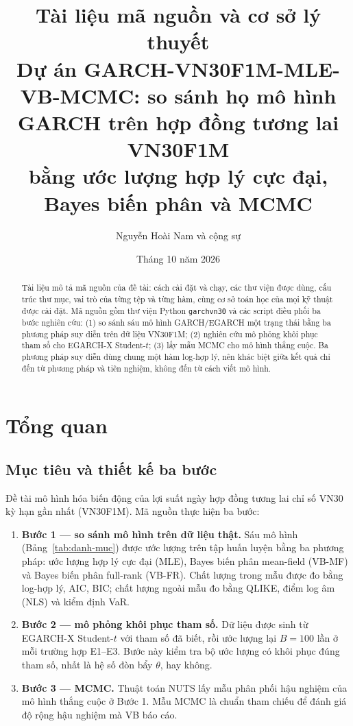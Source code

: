 \documentclass[11pt,a4paper]{article}
\title{\textbf{Tài liệu mã nguồn và cơ sở lý thuyết}\\[0.3em]
\large Dự án GARCH-VN30F1M-MLE-VB-MCMC: so sánh họ mô hình GARCH trên hợp đồng tương lai VN30F1M\\
bằng ước lượng hợp lý cực đại, Bayes biến phân và MCMC}
\author{Nguyễn Hoài Nam và cộng sự}
\date{Tháng 10 năm 2026}
\renewcommand{\_}{\gachduoi\allowbreak}
\newcommand{\tep}[1]{\texttt{#1}}
\begin{document}
\maketitle
\begin{abstract}
\noindent
Tài liệu mô tả mã nguồn của đề tài: cách cài đặt và chạy, các thư viện được dùng, cấu trúc thư mục, vai trò của từng tệp và từng hàm, cùng cơ sở toán học của mọi kỹ thuật được cài đặt. Mã nguồn gồm thư viện Python \tep{garch\_vn30} và các script điều phối ba bước nghiên cứu: (1) so sánh sáu mô hình GARCH/EGARCH một trạng thái bằng ba phương pháp suy diễn trên dữ liệu VN30F1M; (2) nghiên cứu mô phỏng khôi phục tham số cho EGARCH-X Student-$t$; (3) lấy mẫu MCMC cho mô hình thắng cuộc. Ba phương pháp suy diễn dùng chung một hàm log-hợp lý, nên khác biệt giữa kết quả chỉ đến từ phương pháp và tiên nghiệm, không đến từ cách viết mô hình.
\end{abstract}
\tableofcontents
\clearpage

\section{Tổng quan}
\subsection{Mục tiêu và thiết kế ba bước}
Đề tài mô hình hóa biến động của lợi suất ngày hợp đồng tương lai chỉ số VN30 kỳ hạn gần nhất (VN30F1M). Mã nguồn thực hiện ba bước:

\begin{enumerate}
\item \textbf{Bước 1 — so sánh mô hình trên dữ liệu thật.} Sáu mô hình (Bảng~\ref{tab:danh-muc}) được ước lượng trên tập huấn luyện bằng ba phương pháp: ước lượng hợp lý cực đại (MLE), Bayes biến phân mean-field (VB-MF) và Bayes biến phân full-rank (VB-FR). Chất lượng trong mẫu được đo bằng log-hợp lý, AIC, BIC; chất lượng ngoài mẫu đo bằng QLIKE, điểm log âm (NLS) và kiểm định VaR.
\item \textbf{Bước 2 — mô phỏng khôi phục tham số.} Dữ liệu được sinh từ EGARCH-X Student-$t$ với tham số đã biết, rồi ước lượng lại $B=100$ lần ở mỗi trường hợp E1--E3. Bước này kiểm tra bộ ước lượng có khôi phục đúng tham số, nhất là hệ số đòn bẩy $\theta$, hay không.
\item \textbf{Bước 3 — MCMC.} Thuật toán NUTS lấy mẫu phân phối hậu nghiệm của mô hình thắng cuộc ở Bước 1. Mẫu MCMC là chuẩn tham chiếu để đánh giá độ rộng hậu nghiệm mà VB báo cáo.
\end{enumerate}
\end{document}
